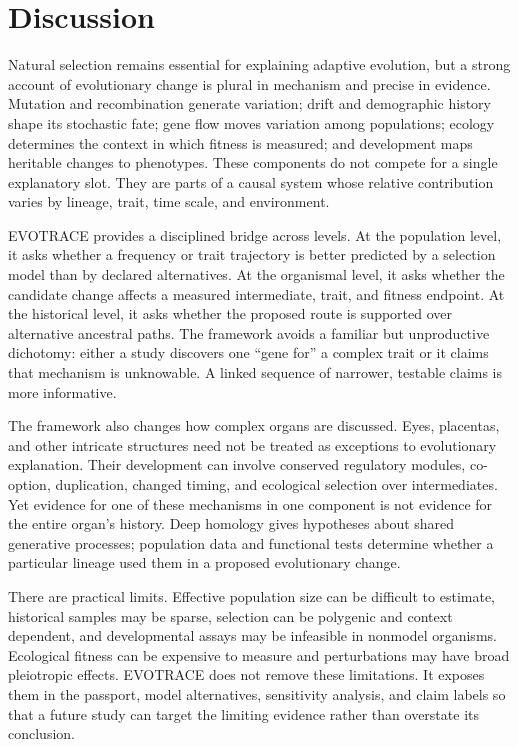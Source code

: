 \documentclass[conference]{IEEEtran}
\begin{document}
\section{Discussion}

Natural selection remains essential for explaining adaptive evolution, but a strong account of evolutionary change is plural in mechanism and precise in evidence. Mutation and recombination generate variation; drift and demographic history shape its stochastic fate; gene flow moves variation among populations; ecology determines the context in which fitness is measured; and development maps heritable changes to phenotypes. These components do not compete for a single explanatory slot. They are parts of a causal system whose relative contribution varies by lineage, trait, time scale, and environment.

EVOTRACE provides a disciplined bridge across levels. At the population level, it asks whether a frequency or trait trajectory is better predicted by a selection model than by declared alternatives. At the organismal level, it asks whether the candidate change affects a measured intermediate, trait, and fitness endpoint. At the historical level, it asks whether the proposed route is supported over alternative ancestral paths. The framework avoids a familiar but unproductive dichotomy: either a study discovers one ``gene for'' a complex trait or it claims that mechanism is unknowable. A linked sequence of narrower, testable claims is more informative.

The framework also changes how complex organs are discussed. Eyes, placentas, and other intricate structures need not be treated as exceptions to evolutionary explanation. Their development can involve conserved regulatory modules, co-option, duplication, changed timing, and ecological selection over intermediates. Yet evidence for one of these mechanisms in one component is not evidence for the entire organ's history. Deep homology gives hypotheses about shared generative processes; population data and functional tests determine whether a particular lineage used them in a proposed evolutionary change.

There are practical limits. Effective population size can be difficult to estimate, historical samples may be sparse, selection can be polygenic and context dependent, and developmental assays may be infeasible in nonmodel organisms. Ecological fitness can be expensive to measure and perturbations may have broad pleiotropic effects. EVOTRACE does not remove these limitations. It exposes them in the passport, model alternatives, sensitivity analysis, and claim labels so that a future study can target the limiting evidence rather than overstate its conclusion.
\end{document}
